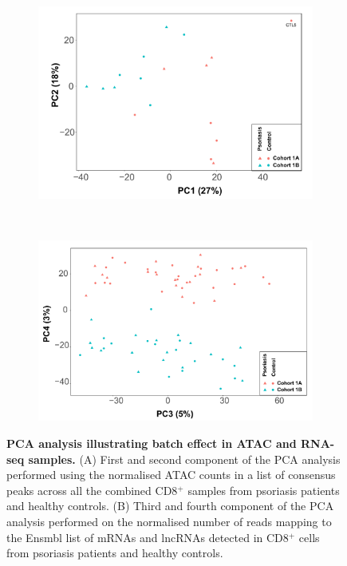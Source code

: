 \bigskip
\begin{figure}[htbp]
\centering
\begin{subfigure}[b]{0.45\textwidth}
\centering 
\includegraphics[width=\textwidth]{./Appendix/pdfs/Chapter4/ATAC_CD8_PS_CTL_PCA}
\caption{}
\end{subfigure}%
~
\begin{subfigure}[b]{0.45\textwidth} 
\centering
\includegraphics[width=\textwidth]{./Appendix/pdfs/Chapter4/PS_CTL_all_samples_varied_PCA3and4_plot}
\caption{}
\end{subfigure}
\caption[PCA analysis illustrating batch effect in ATAC and RNA-seq samples.]{\textbf{PCA analysis illustrating batch effect in ATAC and RNA-seq samples.} (A) First and second component of the PCA analysis performed using the normalised ATAC counts in a list of consensus peaks across all the combined CD8$^+$ samples from psoriasis patients and healthy controls. (B) Third and fourth component of the PCA analysis performed on the normalised number of reads mapping to the Ensmbl list of mRNAs and lncRNAs detected in CD8$^+$ cells from psoriasis patients and healthy controls.}
\label{figure:ATAC_RNAseq_batch_effect}
\end{figure}




